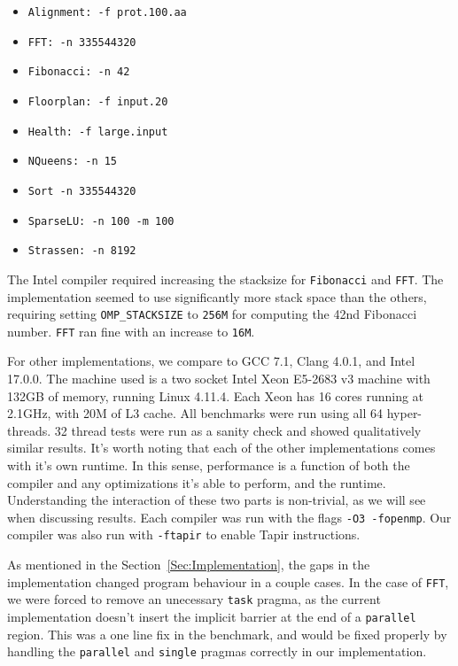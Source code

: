 \documentclass[sigconf]{acmart}
\begin{document}
\begin{itemize}
\item \texttt{Alignment: -f prot.100.aa} 
\item \texttt{FFT: -n 335544320}
\item \texttt{Fibonacci: -n 42}
\item \texttt{Floorplan: -f input.20}
\item \texttt{Health: -f large.input}
\item \texttt{NQueens: -n 15}
\item \texttt{Sort -n 335544320}
\item \texttt{SparseLU: -n 100 -m 100}
\item \texttt{Strassen: -n 8192}
\end{itemize}

The Intel compiler required increasing the stacksize for \texttt{Fibonacci} and
\texttt{FFT}. The implementation seemed to use significantly more stack space
than the others, requiring setting \texttt{OMP\_STACKSIZE} to \texttt{256M} for
computing the 42nd Fibonacci number. \texttt{FFT} ran fine with an increase to
\texttt{16M}.  

For other implementations, we compare to GCC 7.1, Clang 4.0.1, and Intel
17.0.0. The machine used is a two socket Intel Xeon E5-2683 v3 machine with
132GB of memory, running Linux 4.11.4. Each Xeon has 16 cores running at
2.1GHz, with 20M of L3 cache. All benchmarks were run using all 64
hyper-threads. 32 thread tests were run as a sanity check and showed
qualitatively similar results. It's worth noting that each of the other
implementations comes with it's own runtime. In this sense, performance is a
function of both the compiler and any optimizations it's able to perform, and
the runtime.  Understanding the interaction of these two parts is non-trivial,
as we will see when discussing results. Each compiler was run with the flags
\texttt{-O3 -fopenmp}. Our compiler was also run with \texttt{-ftapir} to
enable Tapir instructions.

As mentioned in the Section~\ref{Sec:Implementation}, the gaps in the implementation
changed program behaviour in a couple cases. In the case of \texttt{FFT}, we were
forced to remove an unecessary \texttt{task} pragma, as the current implementation
doesn't insert the implicit barrier at the end of a \texttt{parallel} region. This 
was a one line fix in the benchmark, and would be fixed properly by handling
the \texttt{parallel} and \texttt{single} pragmas correctly in our implementation. 
\end{document}
